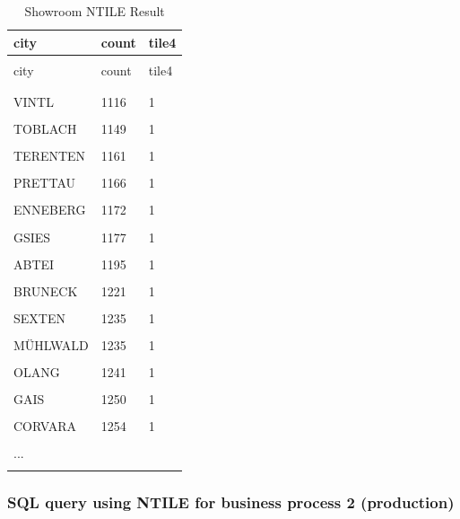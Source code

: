 \documentclass[letterpaper,12pt]{article}
\begin{document}
\begingroup
\renewcommand\arraystretch{0.5}
\begin{longtable}{p{4cm}p{4cm}p{4cm}}
        \caption{Showroom NTILE Result} \\
	city & count & tile4 \\
        \endfirsthead \\
        city & count & tile4 \\
        \endhead \\
	\hline \\
        VINTL & 1116 & 1 \\
        \hline \\
        TOBLACH & 1149 & 1 \\
        \hline \\
        TERENTEN & 1161 & 1 \\
        \hline \\
        PRETTAU & 1166 & 1 \\
        \hline \\
        ENNEBERG & 1172 & 1 \\
        \hline \\
        GSIES & 1177 & 1 \\
        \hline \\
        ABTEI & 1195 & 1 \\
        \hline \\
        BRUNECK & 1221 & 1 \\
        \hline \\
        SEXTEN & 1235 & 1 \\
        \hline \\
        MÜHLWALD & 1235 & 1 \\
        \hline \\
        OLANG & 1241 & 1 \\
        \hline \\
        GAIS & 1250 & 1 \\
        \hline \\
        CORVARA & 1254 & 1 \\
        \hline \\
        ... & & \\
        \hline \\
\end{longtable} 
\endgroup
      
\subsubsection{SQL query using NTILE for business process 2 (production)}
\end{document}
